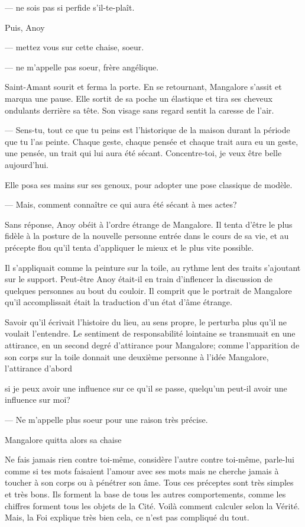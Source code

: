 --- ne sois pas si perfide s'il-te-plaît.

Puis, Anoy 

--- mettez vous sur cette chaise, soeur.

--- ne m'appelle pas soeur, frère angélique.

Saint-Amant sourit et ferma la porte. En se retournant, Mangalore
s'assit et marqua une pause. Elle sortit de sa poche un élastique et
tira ses cheveux ondulants derrière sa tête. Son visage sans regard
sentit la caresse de l'air.

--- Sens-tu, tout ce que tu peins est l'historique de la maison durant
la période que tu l'as peinte. Chaque geste, chaque pensée et chaque
trait aura eu un geste, une pensée, un trait qui lui aura été
sécant. Concentre-toi, je veux être belle aujourd'hui.

Elle posa ses mains sur ses genoux, pour adopter une pose classique de
modèle.

--- Mais, comment connaître ce qui aura été sécant à mes actes?

Sans réponse, Anoy obéit à l'ordre étrange de Mangalore. Il tenta
d'être le plus fidèle à la posture de la nouvelle personne entrée dans
le cours de sa vie, et au précepte flou qu'il tenta d'appliquer le
mieux et le plus vite possible.

Il s'appliquait comme la peinture sur la toile, au rythme lent des
traits s'ajoutant sur le support. Peut-être Anoy était-il en train
d'inflencer la discussion de quelques personnes au bout du couloir. Il
comprit que le portrait de Mangalore qu'il accomplissait était la
traduction d'un état d'âme étrange.

Savoir qu'il écrivait l'histoire du lieu, au sens propre, le perturba
plus qu'il ne voulait l'entendre. Le sentiment de responsabilité
lointaine se transmuait en une attirance, en un second degré
d'attirance pour Mangalore; comme l'apparition de son corps sur la
toile donnait une deuxième personne à l'idée Mangalore, l'attirance
d'abord

si je peux avoir une influence sur ce qu'il se passe, quelqu'un
peut-il avoir une influence sur moi?

--- Ne m'appelle plus soeur pour une raison très précise.

Mangalore quitta alors sa chaise


Ne fais jamais rien contre toi-même, considère l'autre contre
toi-même, parle-lui comme si tes mots faisaient l'amour avec ses mots
mais ne cherche jamais à toucher à son corps ou à pénétrer son
âme. Tous ces préceptes sont très simples et très bons. Ils forment
la base de tous les autres comportements, comme les chiffres forment
tous les objets de la Cité. Voilà comment calculer selon la Vérité.
Mais, la Foi explique très bien cela, ce n'est pas compliqué du tout.

